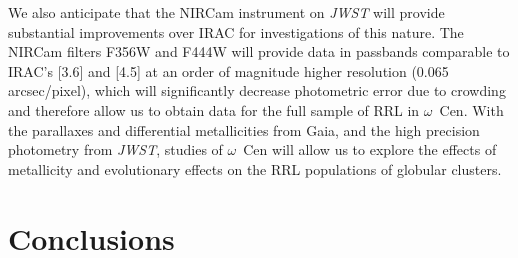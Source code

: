 \documentclass[a4paper,fleqn,usenatbib]{mnras}
\begin{document}
We also anticipate that the NIRCam instrument on {\em JWST} \citep{2005SPIE.5904...21B, 2006SSRv..123..485G} will provide substantial improvements over IRAC for investigations of this nature. The NIRCam filters F356W and F444W will provide data in passbands comparable to IRAC's [3.6] and [4.5] at an order of magnitude higher resolution (0.065 arcsec/pixel), which will significantly decrease photometric error due to crowding and therefore allow us to obtain data for the full sample of RRL in $\omega$~Cen. With the parallaxes and differential metallicities from Gaia, and the high precision photometry from {\it JWST}, studies of $\omega$~Cen will allow us to explore the effects of metallicity and evolutionary effects on the RRL populations of globular clusters. 

\section{Conclusions}
\label{sec:conclusions}
\end{document}
